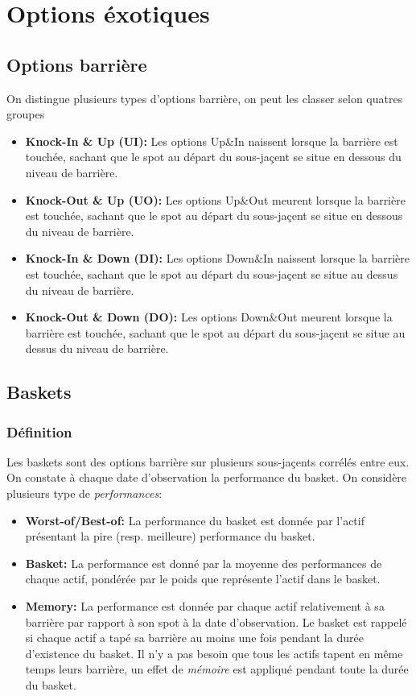 \documentclass[a4paper]{article}
\begin{document}
\section{Options éxotiques}

\subsection{Options barrière}
On distingue plusieurs types d'options barrière, on peut les classer selon quatres groupes 
\begin{itemize}
    \item \textbf{Knock-In \& Up (UI):} Les options Up\&In naissent lorsque la barrière est touchée, sachant que le spot au départ du sous-jaçent se situe en dessous du niveau de barrière.
    \item \textbf{Knock-Out \& Up (UO):} Les options Up\&Out meurent lorsque la barrière est touchée, sachant que le spot au départ du sous-jaçent se situe en dessous du niveau de barrière.
    \item \textbf{Knock-In \& Down (DI):} Les options Down\&In naissent lorsque la barrière est touchée, sachant que le spot au départ du sous-jaçent se situe au dessus du niveau de barrière.
    \item \textbf{Knock-Out \& Down (DO):} Les options Down\&Out meurent lorsque la barrière est touchée, sachant que le spot au départ du sous-jaçent se situe au dessus du niveau de barrière.
\end{itemize}

\subsection{Baskets}
\subsubsection{Définition}
Les baskets sont des options barrière sur plusieurs sous-jaçents corrélés entre eux. On constate à chaque date d'observation la performance du basket. On considère plusieurs type de \textit{performances}:
\begin{itemize}
    \item \textbf{Worst-of/Best-of:} La performance du basket est donnée par l'actif présentant la pire (resp. meilleure) performance du basket.

    \item \textbf{Basket:} La performance est donné par la moyenne des performances de chaque actif, pondérée par le poids que représente  l'actif dans le basket.

    \item \textbf{Memory:} La performance est donnée par chaque actif relativement à sa barrière par rapport à son spot à la date d'observation. Le basket est rappelé si chaque actif a tapé sa barrière au moins une fois pendant la durée d'existence du basket. Il n'y a pas besoin que tous les actifs tapent en même temps leurs barrière, un effet de \textit{mémoire} est appliqué pendant toute la durée du basket.
\end{itemize}
\end{document}
